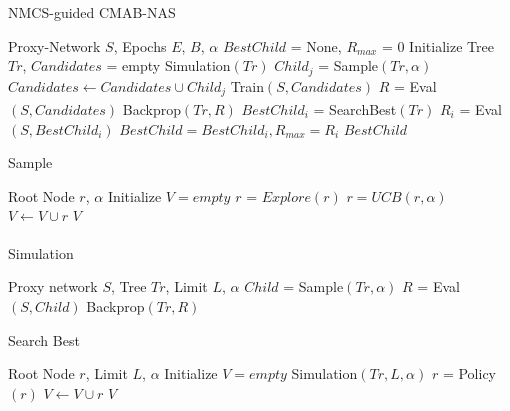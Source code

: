 \documentclass[conference]{IEEEtran}
\begin{document}
\begin{algorithm}[ht!]
\caption{NMCS-guided CMAB-NAS}
\label{alg:CMAB-NAS}
\begin{algorithmic}[1]
 Proxy-Network $S$, Epochs $E$, $B$, $\alpha$
\State $BestChild$ = None, $R_{max}$ = $0$
    \State Initialize Tree $Tr$, $Candidates$ = empty
     
        \State Simulation$(Tr)$ 
        \State $Child_j$ = Sample$(Tr, \alpha)$ 
        \State $Candidates \xleftarrow[]{} Candidates \cup Child_j$
    \EndFor
    \State Train$(S, Candidates)$
    \State $R$ = Eval$(S, Candidates)$
    \State Backprop$(Tr, R)$ 
    \State $BestChild_i$ = SearchBest$(Tr)$ 
    \State $R_i$ = Eval$(S, BestChild_i)$
        \State $BestChild=BestChild_i, R_{max}=R_i$
    \EndIf
\EndFor
{} $BestChild$
\end{algorithmic}
\end{algorithm}

\label{sec:aux_algorithms}
\begin{algorithm}[ht!]
   \caption{Sample}
   \label{alg:uctsample}
\begin{algorithmic}[1]
    Root Node $r$, $\alpha$
   \State Initialize $V = empty$
   \Repeat
   \State $r$ = $Explore(r)$ 
   \Else
   \State $r = UCB(r, \alpha)$
   \EndIf
   \State $V \xleftarrow[]{} V \cup r$
    $V$
\end{algorithmic}
\end{algorithm}

\begin{algorithm}[h!]
   \caption{Simulation}
   \label{alg:uctsimulation}
\begin{algorithmic}[1]
    Proxy network $S$, Tree $Tr$, Limit $L$, $\alpha$
   \State $Child$ = Sample$(Tr, \alpha)$
   \State $R$ = Eval$(S, Child)$
   \State Backprop$(Tr, R)$
   \EndFor
\end{algorithmic}
\end{algorithm}

\begin{algorithm}[h!]
   \caption{Search Best}
   \label{alg:uct_search_best}
\begin{algorithmic}[1]
    Root Node $r$, Limit $L$, $\alpha$
   \State Initialize $V = empty$
   \Repeat
   \State Simulation$(Tr, L, \alpha)$
   \State $r$ = Policy$(r)$
   \State $V \xleftarrow[]{} V \cup r$
    $V$
\end{algorithmic}
\end{algorithm}
\end{document}
